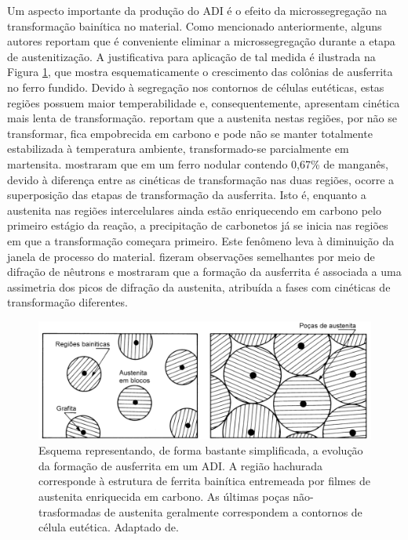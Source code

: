 Um aspecto importante da produção do ADI é o efeito da microssegregação na transformação bainítica no material. Como mencionado anteriormente, alguns autores reportam que é conveniente eliminar a microssegregação durante a etapa de austenitização. A justificativa para aplicação de tal medida é ilustrada na Figura \ref{fig:cineticaADI}, que mostra esquematicamente o crescimento das colônias de ausferrita no ferro fundido. Devido à segregação nos contornos de células eutéticas, estas regiões possuem maior temperabilidade e, consequentemente, apresentam cinética mais lenta de transformação.  reportam que a austenita nestas regiões, por não se transformar, fica empobrecida em carbono e pode não se manter totalmente estabilizada à temperatura ambiente, transformado-se parcialmente em martensita.  mostraram que em um ferro nodular contendo 0,67\% de manganês, devido à diferença entre as cinéticas de transformação nas duas regiões, ocorre a superposição das etapas de transformação da ausferrita. Isto é, enquanto a austenita nas regiões intercelulares ainda estão enriquecendo em carbono pelo primeiro estágio da reação, a precipitação de carbonetos já se inicia nas regiões em que a transformação começara primeiro. Este fenômeno leva à diminuição da janela de processo do material.  fizeram observações semelhantes por meio de difração de nêutrons  e mostraram que a formação da ausferrita é associada a uma assimetria dos picos de difração da austenita, atribuída a fases com cinéticas de transformação diferentes.

\begin{figure}
  \includegraphics[width=16cm]{img/crescimentoAusferrita.pdf}
  \caption{Esquema representando, de forma bastante simplificada, a evolução da formação de ausferrita em um ADI. A região hachurada corresponde à estrutura de ferrita bainítica entremeada por filmes de austenita enriquecida em carbono. As últimas poças não-trasformadas de austenita geralmente correspondem a contornos de célula eutética. Adaptado de\cite{Aranzabal1997}.}
  \label{fig:cineticaADI}
\end{figure}


